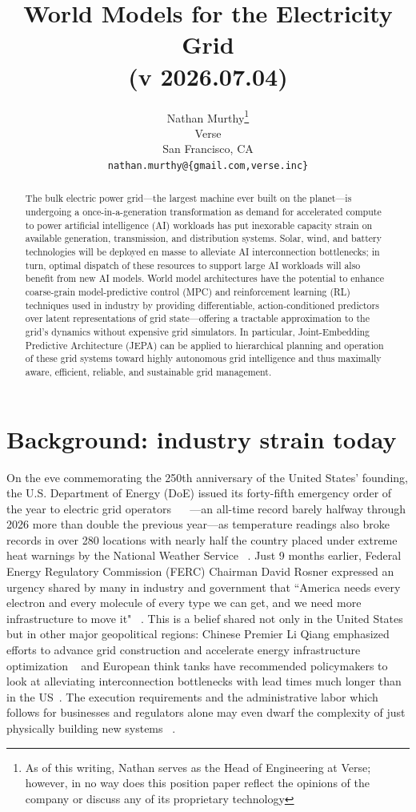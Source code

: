 \documentclass{article}
\title{World Models for the Electricity Grid \\ (v 2026.07.04)}
\author{%
  Nathan Murthy\thanks{As of this writing, Nathan serves as the Head of Engineering at Verse; however, in no way does this position paper reflect the opinions of the company or discuss any of its proprietary technology} \\
  Verse \\
  San Francisco, CA \\
  \texttt{nathan.murthy@\{gmail.com,verse.inc\}} \\
}
\begin{document}
\maketitle


\begin{abstract}
  The bulk electric power grid---the largest machine ever built on the planet---is undergoing a
  once-in-a-generation transformation as demand for accelerated compute to power artificial
  intelligence (AI) workloads has put inexorable capacity strain on available generation,
  transmission, and distribution systems. Solar, wind, and battery technologies will be deployed
  en masse to alleviate AI interconnection bottlenecks; in turn, optimal dispatch of these
  resources to support large AI workloads will also benefit from new AI models. World model
  architectures have the potential to enhance coarse-grain model-predictive control (MPC) and
  reinforcement learning (RL) techniques used in industry by providing differentiable, 
  action-conditioned predictors over latent representations of grid state---offering a tractable
  approximation to the grid's dynamics without expensive grid simulators.  In particular,
  Joint-Embedding Predictive Architecture (JEPA) can be applied to hierarchical planning and 
  operation of these grid systems toward highly autonomous grid intelligence and thus maximally
  aware, efficient, reliable, and sustainable grid management.

\end{abstract}


\section{Background: industry strain today}

On the eve commemorating the 250th anniversary of the United States' founding, the U.S.
Department of Energy (DoE) issued its forty-fifth emergency order of the year to electric grid 
operators ~\cite{Frazin2026} ~\cite{DoE_202c_2026}---an all-time record barely halfway through
2026 more than double the previous year---as temperature readings also broke records in over
280 locations with nearly half the country placed under extreme heat warnings by the National 
Weather Service ~\cite{Ittai2026}. Just 9 months earlier, Federal Energy Regulatory Commission
(FERC) Chairman David Rosner expressed an urgency shared by many in industry and government
that “America needs every  electron and every molecule of every type we can get, and we need
more infrastructure to move it" ~\cite{Howland2025}. This is a belief shared not only in the
United States but in other major geopolitical regions: Chinese Premier Li Qiang emphasized
efforts to advance grid construction and accelerate energy infrastructure optimization
~\cite{Xinua2026} and European think tanks have recommended policymakers to look at alleviating
interconnection bottlenecks with lead times much longer than in the US~\cite{Hajdari2026}. The
execution requirements and the administrative labor which follows for businesses and regulators
alone may even dwarf the complexity of just physically building new systems ~\cite{Sguazzi2026}.
\end{document}
